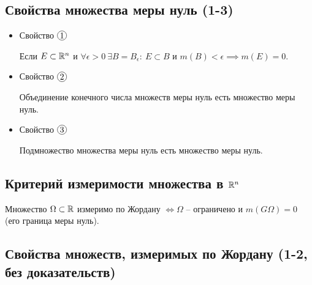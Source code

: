 \newpage

\subsection{Свойства множества меры нуль (1-3)}

\begin{itemize}
    \item Свойство $ \circled{1} $
          \begin{statement}
              Если $ E \subset \mathbb{R}^n $ и $ \forall \epsilon > 0 \ \exists B = B_\epsilon: \ E \subset B $ и $ m(B) < \epsilon \implies m(E) = 0 $.
          \end{statement}

    \item Свойство $ \circled{2} $
          \begin{statement}
              Объединение конечного числа множеств меры нуль есть множество меры нуль.
          \end{statement}

    \item Свойство $ \circled{3} $
          \begin{statement}
              Подмножество множества меры нуль есть множество меры нуль.
          \end{statement}
\end{itemize}

\subsection{Критерий измеримости множества в $\mathbb{R}^n$}

\begin{theorem}
    Множество $ \Omega \subset \mathbb{R} $ измеримо по Жордану $ \iff \Omega $ -- ограничено и $ m(G\Omega) = 0 $ (его граница меры нуль).
\end{theorem}

\subsection{Свойства множеств, измеримых по Жордану (1-2, без доказательств)}

